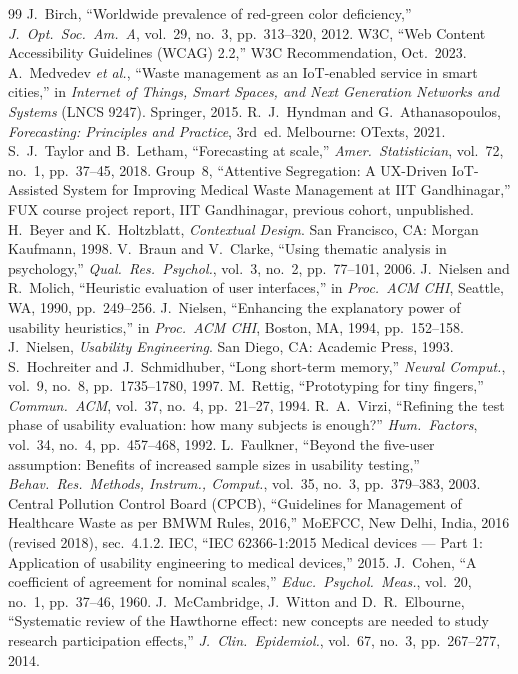 \documentclass[10pt,twocolumn,a4paper]{article}
\begin{document}
\begin{thebibliography}{99}
 J.\ Birch, ``Worldwide prevalence of red-green color deficiency,'' \emph{J.\ Opt.\ Soc.\ Am.\ A}, vol.~29, no.~3, pp.~313--320, 2012.
 W3C, ``Web Content Accessibility Guidelines (WCAG) 2.2,'' W3C Recommendation, Oct.~2023.
 A.\ Medvedev \emph{et al.}, ``Waste management as an IoT-enabled service in smart cities,'' in \emph{Internet of Things, Smart Spaces, and Next Generation Networks and Systems} (LNCS 9247). Springer, 2015.
 R.\ J.\ Hyndman and G.\ Athanasopoulos, \emph{Forecasting: Principles and Practice}, 3rd~ed. Melbourne: OTexts, 2021.
 S.\ J.\ Taylor and B.\ Letham, ``Forecasting at scale,'' \emph{Amer.\ Statistician}, vol.~72, no.~1, pp.~37--45, 2018.
 Group~8, ``Attentive Segregation: A UX-Driven IoT-Assisted System for Improving Medical Waste Management at IIT Gandhinagar,'' FUX course project report, IIT Gandhinagar, previous cohort, unpublished.
 H.\ Beyer and K.\ Holtzblatt, \emph{Contextual Design}. San Francisco, CA: Morgan Kaufmann, 1998.
 V.\ Braun and V.\ Clarke, ``Using thematic analysis in psychology,'' \emph{Qual.\ Res.\ Psychol.}, vol.~3, no.~2, pp.~77--101, 2006.
 J.\ Nielsen and R.\ Molich, ``Heuristic evaluation of user interfaces,'' in \emph{Proc.\ ACM CHI}, Seattle, WA, 1990, pp.~249--256.
 J.\ Nielsen, ``Enhancing the explanatory power of usability heuristics,'' in \emph{Proc.\ ACM CHI}, Boston, MA, 1994, pp.~152--158.
 J.\ Nielsen, \emph{Usability Engineering}. San Diego, CA: Academic Press, 1993.
 S.\ Hochreiter and J.\ Schmidhuber, ``Long short-term memory,'' \emph{Neural Comput.}, vol.~9, no.~8, pp.~1735--1780, 1997.
 M.\ Rettig, ``Prototyping for tiny fingers,'' \emph{Commun.\ ACM}, vol.~37, no.~4, pp.~21--27, 1994.
 R.\ A.\ Virzi, ``Refining the test phase of usability evaluation: how many subjects is enough?'' \emph{Hum.\ Factors}, vol.~34, no.~4, pp.~457--468, 1992.
 L.\ Faulkner, ``Beyond the five-user assumption: Benefits of increased sample sizes in usability testing,'' \emph{Behav.\ Res.\ Methods, Instrum., Comput.}, vol.~35, no.~3, pp.~379--383, 2003.
 Central Pollution Control Board (CPCB), ``Guidelines for Management of Healthcare Waste as per BMWM Rules, 2016,'' MoEFCC, New Delhi, India, 2016 (revised 2018), sec.~4.1.2.
 IEC, ``IEC 62366-1:2015 Medical devices --- Part 1: Application of usability engineering to medical devices,'' 2015.
 J.\ Cohen, ``A coefficient of agreement for nominal scales,'' \emph{Educ.\ Psychol.\ Meas.}, vol.~20, no.~1, pp.~37--46, 1960.
 J.\ McCambridge, J.\ Witton and D.\ R.\ Elbourne, ``Systematic review of the Hawthorne effect: new concepts are needed to study research participation effects,'' \emph{J.\ Clin.\ Epidemiol.}, vol.~67, no.~3, pp.~267--277, 2014.

\end{thebibliography}
\end{document}
